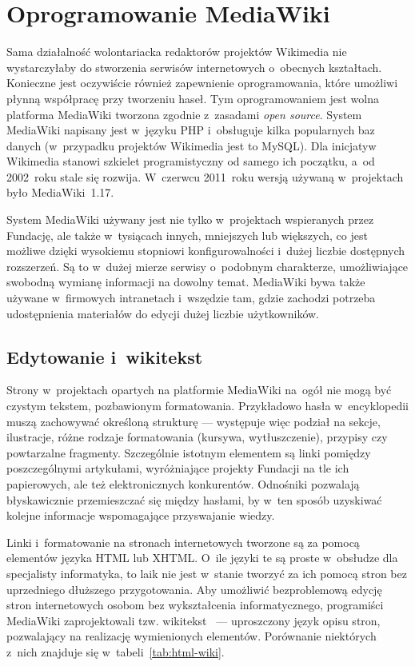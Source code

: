\section{Oprogramowanie MediaWiki}
\label{sec:mw}
Sama działalność wolontariacka redaktorów projektów Wikimedia nie wystarczyłaby do stworzenia serwisów internetowych o~obecnych kształtach. Konieczne jest oczywiście również zapewnienie oprogramowania, które umożliwi płynną współpracę przy tworzeniu haseł. Tym oprogramowaniem jest wolna platforma MediaWiki tworzona zgodnie z~zasadami \emph{open source}. System MediaWiki napisany jest w~języku PHP i~obsługuje kilka popularnych baz danych (w~przypadku projektów Wikimedia jest to MySQL). Dla inicjatyw Wikimedia stanowi szkielet programistyczny od samego ich początku, a~od 2002~roku stale się rozwija. W~czerwcu 2011~roku wersją używaną w~projektach było MediaWiki~1.17.

System MediaWiki używany jest nie tylko w~projektach wspieranych przez Fundację, ale także w~tysiącach innych, mniejszych lub większych, co jest możliwe dzięki wysokiemu stopniowi konfigurowalności i~dużej liczbie dostępnych rozszerzeń. Są to w~dużej mierze serwisy o~podobnym charakterze, umożliwiające swobodną wymianę informacji na dowolny temat. MediaWiki bywa także używane w~firmowych intranetach i~wszędzie tam, gdzie zachodzi potrzeba udostępnienia materiałów do edycji dużej liczbie użytkowników.

\subsection{Edytowanie i~wikitekst}
Strony w~projektach opartych na platformie MediaWiki na~ogół nie mogą być czystym tekstem, pozbawionym formatowania. Przykładowo hasła w~encyklopedii muszą zachowywać określoną strukturę --- występuje więc podział na sekcje, ilustracje, różne rodzaje formatowania (kursywa, wytłuszczenie), przypisy czy powtarzalne fragmenty. Szczególnie istotnym elementem są linki pomiędzy poszczególnymi artykułami, wyróżniające projekty Fundacji na tle ich papierowych, ale też elektronicznych konkurentów. Odnośniki pozwalają błyskawicznie przemieszczać się między hasłami, by w~ten sposób uzyskiwać kolejne informacje wspomagające przyswajanie wiedzy.

Linki i~formatowanie na stronach internetowych tworzone są za pomocą elementów języka HTML lub XHTML. O~ile języki te są proste w~obsłudze dla specjalisty informatyka, to laik nie jest w~stanie tworzyć za ich pomocą stron bez uprzedniego dłuższego przygotowania. Aby umożliwić bezproblemową edycję stron internetowych osobom bez wykształcenia informatycznego, programiści MediaWiki zaprojektowali tzw. wikitekst~\cite{mw:help} --- uproszczony język opisu stron, pozwalający na realizację wymienionych elementów. Porównanie niektórych z~nich znajduje się w~tabeli~\ref{tab:html-wiki}.

